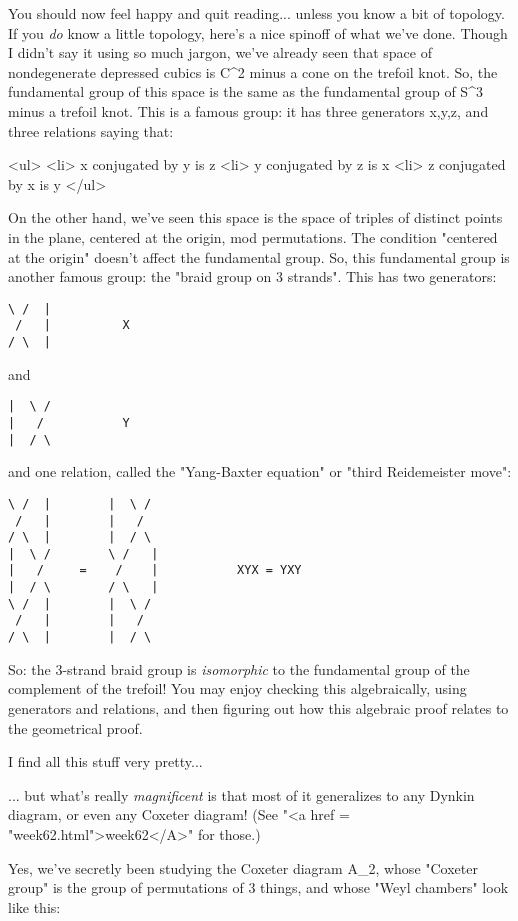 You should now feel happy and quit reading... unless you
know a bit of topology.  If you \emph{do} know a little topology, 
here's a nice spinoff of what we've done.   Though I didn't say
it using so much jargon, we've already seen that space of 
nondegenerate depressed cubics is C^{2} minus a cone on the 
trefoil knot.  So, the fundamental group of this space is the
same as the fundamental group of S^{3} minus a trefoil knot.  
This is a famous group: it has three generators x,y,z, and three 
relations saying that:

<ul>
<li>
x conjugated by y is z 
<li>
y conjugated by z is x 
<li>
z conjugated by x is y 
</ul>

On the other hand, we've seen this space is the space of triples
of distinct points in the plane, centered at the origin, mod 
permutations.   The condition "centered at the origin"
doesn't affect the fundamental group.  So, this fundamental 
group is another famous group: the "braid group on 3 strands".  
This has two generators:

\begin{verbatim}
\ /  |
 /   |          X
/ \  |
\end{verbatim}
    
and

\begin{verbatim}
|  \ /
|   /           Y
|  / \
\end{verbatim}
    
and one relation, called the "Yang-Baxter equation" or "third 
Reidemeister move":

\begin{verbatim}
\ /  |        |  \ /
 /   |        |   /
/ \  |        |  / \
|  \ /        \ /   |
|   /     =    /    |           XYX = YXY
|  / \        / \   |
\ /  |        |  \ /
 /   |        |   /
/ \  |        |  / \
\end{verbatim}
    
So: the 3-strand braid group is \emph{isomorphic} to the fundamental 
group of the complement of the trefoil!  You may enjoy checking 
this algebraically, using generators and relations, and then 
figuring out how this algebraic proof relates to the geometrical 
proof.

I find all this stuff very pretty...

... but what's really \emph{magnificent} is that most of it
generalizes to any Dynkin diagram, or even any Coxeter diagram!  (See
"<a href = "week62.html">week62</A>" for those.)

Yes, we've secretly been studying the Coxeter diagram A_{2}, whose 
"Coxeter group" is the group of permutations of 3 things, and whose 
"Weyl chambers" look like this:

